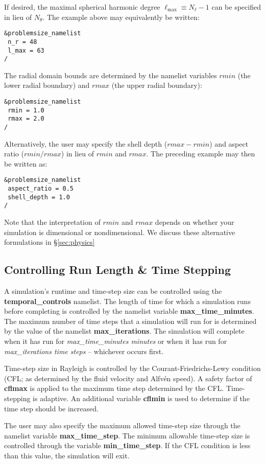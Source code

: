 If desired, the maximal spherical harmonic degree $\ell_\mathrm{max}\equiv N_\ell-1$ can be specified in lieu of $N_\theta$.  The example above may equivalently be written:
\begin{lstlisting}
&problemsize_namelist
 n_r = 48
 l_max = 63
/
\end{lstlisting}

The radial domain bounds are determined by the namelist variables $rmin$ (the lower radial boundary) and $rmax$ (the upper radial boundary):
\begin{lstlisting}
&problemsize_namelist
 rmin = 1.0
 rmax = 2.0
/
\end{lstlisting}

Alternatively, the user may specify the shell depth ($rmax-rmin$) and aspect ratio ($rmin/rmax$) in lieu of $rmin$ and $rmax$.  The preceding example may then be written as:
\begin{lstlisting}
&problemsize_namelist
 aspect_ratio = 0.5
 shell_depth = 1.0
/
\end{lstlisting}

Note that the interpretation of $rmin$ and $rmax$ depends on whether your simulation is dimensional or nondimensional.  We discuss these alternative formulations in \S \ref{sec:physics}


\subsection{Controlling Run Length \& Time Stepping}

A simulation's runtime and time-step size can be controlled using the \textbf{temporal\_controls} namelist.  The length of time for which a simulation runs before completing is controlled by the namelist variable \textbf{max\_time\_minutes}.  The maximum number of time steps that a simulation will run for is determined by the value of the namelist \textbf{max\_iterations}.  The simulation will complete when it has run for \textit{max\_time\_minutes minutes} or when it has run for \textit{max\_iterations time steps} -- whichever occurs first.

Time-step size in Rayleigh is controlled by the Courant-Friedrichs-Lewy condition (CFL; as determined by the fluid velocity and Alfv\'{e}n speed).  A safety factor of \textbf{cflmax} is applied to the maximum time step determined by the CFL.  Time-stepping is adaptive.  An additional variable \textbf{cflmin} is used to determine if the time step should be increased.  

The user may also specify the maximum allowed time-step size through the namelist variable \textbf{max\_time\_step}.  The minimum allowable time-step size is controlled through the variable \textbf{min\_time\_step}.  If the CFL condition is less than this value, the simulation will exit.

